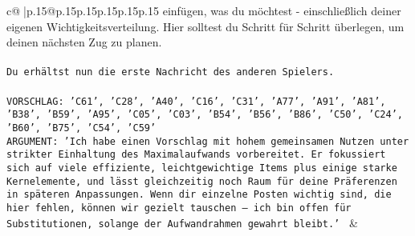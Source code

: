 \documentclass{article}
\begin{document}
{\begin{supertabular}{c@{$\;$}|p{.15\linewidth}@{}p{.15\linewidth}p{.15\linewidth}p{.15\linewidth}p{.15\linewidth}p{.15\linewidth}}
{{{einfügen, was du möchtest - einschließlich deiner eigenen Wichtigkeitsverteilung. Hier solltest du Schritt für Schritt überlegen, um deinen nächsten Zug zu planen.\\ \tt \\ \tt Du erhältst nun die erste Nachricht des anderen Spielers.\\ \tt \\ \tt VORSCHLAG: {'C61', 'C28', 'A40', 'C16', 'C31', 'A77', 'A91', 'A81', 'B38', 'B59', 'A95', 'C05', 'C03', 'B54', 'B56', 'B86', 'C50', 'C24', 'B60', 'B75', 'C54', 'C59'}\\ \tt ARGUMENT: {'Ich habe einen Vorschlag mit hohem gemeinsamen Nutzen unter strikter Einhaltung des Maximalaufwands vorbereitet. Er fokussiert sich auf viele effiziente, leichtgewichtige Items plus einige starke Kernelemente, und lässt gleichzeitig noch Raum für deine Präferenzen in späteren Anpassungen. Wenn dir einzelne Posten wichtig sind, die hier fehlen, können wir gezielt tauschen – ich bin offen für Substitutionen, solange der Aufwandrahmen gewahrt bleibt.'} 
	  } 
	   } 
	   } 
	 & \\ 
 

    \theutterance {}  


\end{supertabular}}
\end{document}
